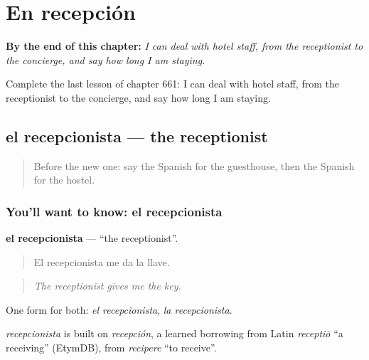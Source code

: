 
\chapter{En recepción}
\label{ch:es-en-recepcion}

\begin{chapteropening}
\textbf{By the end of this chapter:} \emph{I can deal with hotel staff, from the receptionist to the concierge, and say how long I am staying.}

Complete the last lesson of chapter 661: I can deal with hotel staff, from the receptionist to the concierge, and say how long I am staying.
\end{chapteropening}

\section[el recepcionista]{el recepcionista — the receptionist}

\label{lesson:ES-C661-recepcionista}



\begin{quote}
Before the new one: say the Spanish for the guesthouse, then the Spanish for the hostel.
\end{quote}

\subsection*{You'll want to know: el recepcionista}
\textbf{el recepcionista} — \textquotedblleft{}the receptionist\textquotedblright{}.

\begin{quote}
El recepcionista me da la llave.
\end{quote}

\begin{quote}
\emph{The receptionist gives me the key.}
\end{quote}

One form for both: \emph{el recepcionista}, \emph{la recepcionista}.

\begin{cousinweb}
\emph{recepcionista} is built on \emph{recepción}, a learned borrowing from Latin \emph{receptiō} \textquotedblleft{}a receiving\textquotedblright{} (EtymDB), from \emph{recipere} \textquotedblleft{}to receive\textquotedblright{}.
\end{cousinweb}

